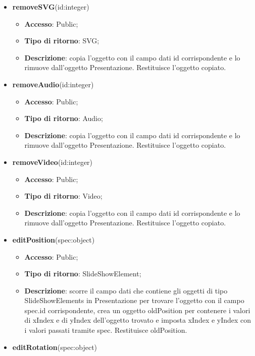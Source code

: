 {\begin{itemize}
\begin{itemize}
			\end{itemize}
			\item \textbf{removeSVG}(id:integer)
			\begin{itemize}
				\item \textbf{Accesso}: Public;
				\item \textbf{Tipo di ritorno}: SVG;
				\item \textbf{Descrizione}: copia l’oggetto con il campo dati id corrispondente e lo rimuove dall’oggetto Presentazione. Restituisce l’oggetto copiato.
			\end{itemize}
			\item \textbf{removeAudio}(id:integer)
			\begin{itemize}
				\item \textbf{Accesso}: Public;
				\item \textbf{Tipo di ritorno}: Audio;
				\item \textbf{Descrizione}: copia l’oggetto con il campo dati id corrispondente e lo rimuove dall’oggetto Presentazione. Restituisce l’oggetto copiato.
			\end{itemize}
			\item \textbf{removeVideo}(id:integer)
			\begin{itemize}
				\item \textbf{Accesso}: Public;
				\item \textbf{Tipo di ritorno}: Video;
				\item \textbf{Descrizione}: copia l’oggetto con il campo dati id corrispondente e lo rimuove dall’oggetto Presentazione. Restituisce l’oggetto copiato.
			\end{itemize}
			\item \textbf{editPosition}(spec:object)
			\begin{itemize}
				\item \textbf{Accesso}: Public;
				\item \textbf{Tipo di ritorno}: SlideShowElement;
				\item \textbf{Descrizione}: scorre il campo dati che contiene gli oggetti di tipo SlideShowElements in Presentazione per trovare l’oggetto con il campo spec.id corrispondente, crea un oggetto oldPosition per contenere i valori di xIndex e di yIndex dell’oggetto trovato e imposta xIndex e yIndex con i valori passati tramite spec. Restituisce oldPosition.
			\end{itemize}
			\item \textbf{editRotation}(spec:object)
			\begin{itemize}

\end{itemize}
\end{itemize}}
